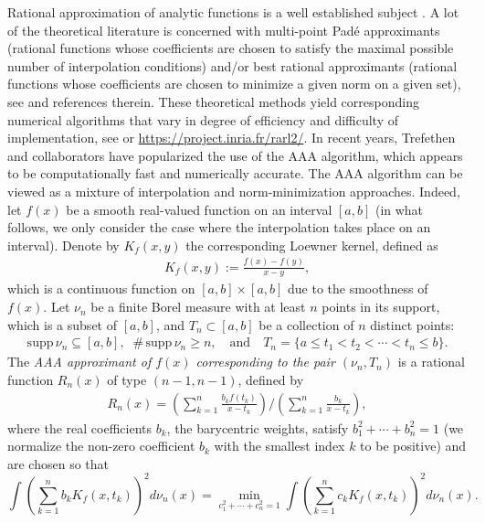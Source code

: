 \documentclass[twoside,a4paper]{amsart}
\newcommand{\supp}{\mathrm{supp}}
\theoremstyle{remark}
\begin{document}
Rational approximation of analytic functions is a well established subject \cite{BakerGraves-Morris,Gaier,PetrushevPopov,StahlTotik,Walsh}. A lot of the theoretical literature is concerned with multi-point Pad\'e approximants (rational functions whose coefficients are chosen to satisfy the maximal possible number of interpolation conditions) and/or best rational approximants (rational functions whose coefficients are chosen to minimize a given norm on a given set), see \cite{uBarYa,BarStYa12,GonRakh87} and references therein.  These theoretical methods yield corresponding numerical algorithms that vary in degree of efficiency and difficulty of implementation, see \cite{Meinardus,Trefethen} or \url{https://project.inria.fr/rarl2/}. In recent years, Trefethen and collaborators \cite{MR3805855,MR5088237} have popularized the use of the AAA algorithm, which appears to be computationally fast and numerically accurate. The AAA algorithm can be viewed as a mixture of interpolation and norm-minimization approaches. Indeed, let \( f(x) \) be a smooth real-valued function on an interval $[a,b]$ (in what follows, we only consider the case where the interpolation  takes place on an interval). Denote by \( K_f(x,y) \) the corresponding Loewner kernel, defined as
\begin{align}
\label{Loewner kernel}
K_f(x,y) := \frac{f(x)-f(y)}{x-y},
\end{align}
which is a continuous function on $[a,b]\times[a,b]$ due to the  smoothness of \( f(x) \). Let  \( {\nu_n} \) be a finite Borel measure with at least \( n \) points in its support, which is a subset of $[a,b]$, and \( T_n\subset [a,b] \) be a collection of \( n \) distinct points:
\begin{align}
\label{nu_n and T_n}
\supp\,\nu_n\subseteq [a,b], \;\; \#\,\supp\,\nu_n\geq n, \quad \text{and} \quad T_n=\{a\leq t_1<t_2<\cdots<t_n\leq b\}.
\end{align}
 The \emph{AAA approximant of \( f(x) \) corresponding to the pair \( (\nu_n,T_n) \)} is a rational function \( R_n(x) \) of type \( (n-1,n-1) \),  defined by
\begin{align}
\label{AAA}
R_n(x) = \left( \sum_{k=1}^n \frac{b_k f(t_k)}{x-t_k} \right) / \left( \sum_{k=1}^n \frac{b_k}{x-t_k} \right),
\end{align}
where the real coefficients  \( b_k \), the barycentric weights, satisfy \( b_1^2+\cdots+b_n^2=1 \) (we normalize the non-zero coefficient $b_k$ with the smallest index $k$ to be positive) and are chosen so that
\begin{equation}
\label{L2-min}
\int\left( \sum_{k=1}^n b_k K_f(x,t_k) \right)^2 d{\nu_n}(x) = \min_{c_1^2+\cdots+c_n^2=1}\int\left( \sum_{k=1}^n c_k K_f(x,t_k) \right)^2 d{\nu_n}(x).
\end{equation}
\end{document}
